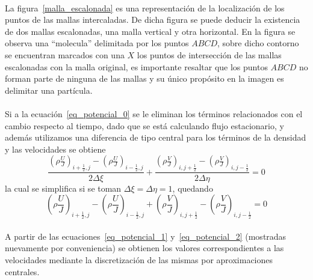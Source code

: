 \documentclass[letterpaper, openright, 12pt]{book}
\begin{document}
    \paragraph*{}
        La figura~\ref{malla_escalonada} es una representación de la
        localización de los puntos de las mallas intercaladas. De dicha figura
        se puede deducir la existencia de dos mallas escalonadas, una malla
        vertical y otra horizontal. En la figura se observa una ``molecula''
        delimitada por los puntos $ABCD$, sobre dicho contorno se encuentran
        marcados con una $X$ los puntos de intersección de las mallas
        escalonadas con la malla original, es importante resaltar que los puntos
        $ABCD$ no forman parte de ninguna de las mallas y su único propósito en
        la imagen es delimitar una partícula.

    \paragraph*{}
        Si a la ecuación~\ref{eq_potencial_0} se le eliminan los términos
        relacionados con el cambio respecto al tiempo, dado que se está
        calculando flujo estacionario, y además utilizamos una diferencia de
        tipo central para los términos de la densidad y las velocidades se 
        obtiene
        \begin{equation}
            \frac{\left (\rho \frac{U}{J} \right)_{i + \frac{1}{2}, j} -
                \left( \rho \frac{U}{J} \right)_{i - \frac{1}{2}, j}}{2\Delta\xi}
            + \frac{\left (\rho \frac{V}{J} \right)_{i,j + \frac{1}{2}} -
                \left( \rho \frac{V}{J} \right)_{i, j - \frac{1}{2}}}{2\Delta\eta}
            = 0
        \end{equation}
        la cual se simplifica si se toman $\Delta\xi = \Delta\eta = 1$, quedando
        \begin{equation}
            \left (\rho \frac{U}{J} \right)_{i + \frac{1}{2}, j} -
                \left( \rho \frac{U}{J} \right)_{i - \frac{1}{2}, j}
            + \left (\rho \frac{V}{J} \right)_{i,j + \frac{1}{2}} -
                \left( \rho \frac{V}{J} \right)_{i, j - \frac{1}{2}}
            = 0
            \label{eq_potencial_3}
        \end{equation}

    \paragraph*{}
        A partir de las ecuaciones~\ref{eq_potencial_1} y~\ref{eq_potencial_2}
        (mostradas nuevamente por conveniencia) se obtienen los valores
        correspondientes a las velocidades mediante la discretización de las
        mismas por aproximaciones centrales.
\end{document}
